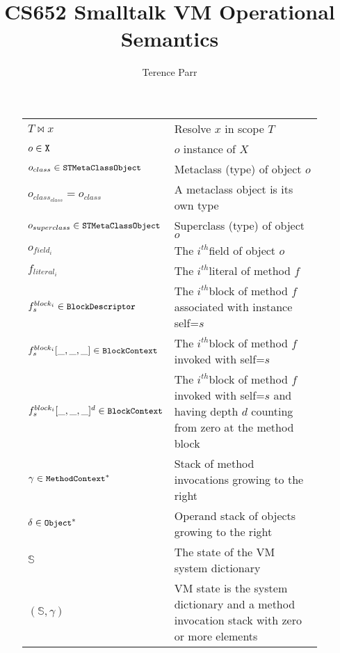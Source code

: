 \documentclass[11pt]{article}
\title{CS652 Smalltalk VM Operational Semantics}
\author{Terence Parr}
\newcommand{\ith}{$i^{th}$}
\begin{document}
\maketitle

\begin{figure}
\begin{center}
\begin{tabular}{l p{8cm}}
$T \bowtie x$ & Resolve $x$ in scope $T$ \\

$o \in \text{\tt X}$ & $o$ instance of $X$\\

$o_{class} \in \text{\tt\small STMetaClassObject}$ & Metaclass (type) of object $o$\\

$o_{class_{class}}=o_{class}$ &  A metaclass object is its own type\\

$o_{superclass} \in \text{\tt\small STMetaClassObject}$ & Superclass (type) of object $o$\\

$o_{field_i}$ & The \ith field of object $o$ \\

$f_{literal_i}$ & The \ith literal of method $f$ \\

$f^{block_i}_s \in \text{\tt\small BlockDescriptor}$ & The \ith block of method $f$ associated with instance self=$s$\\

$f^{block_i}_s[\_,\_,\_] \in \text{\tt\small BlockContext}$ & The \ith block of method $f$ invoked with self=$s$\\

$f^{block_i}_s[\_,\_,\_]^d \in \text{\tt\small BlockContext}$ & The \ith block of method $f$ invoked with self=$s$ and having depth $d$ counting from zero at the method block\\

$\gamma \in \text{\tt\small MethodContext}^*$ & Stack of method invocations growing to the right\\

$\delta \in \text{\tt\small Object}^*$ &  Operand stack of objects growing to the right\\

$\mathbb{S}$ & The state of the VM system dictionary\\

$(\mathbb{S},\gamma)$ & VM state is the system dictionary and a method invocation stack with zero or more elements\\


\end{tabular}
\end{center}
\end{figure}
\end{document}
